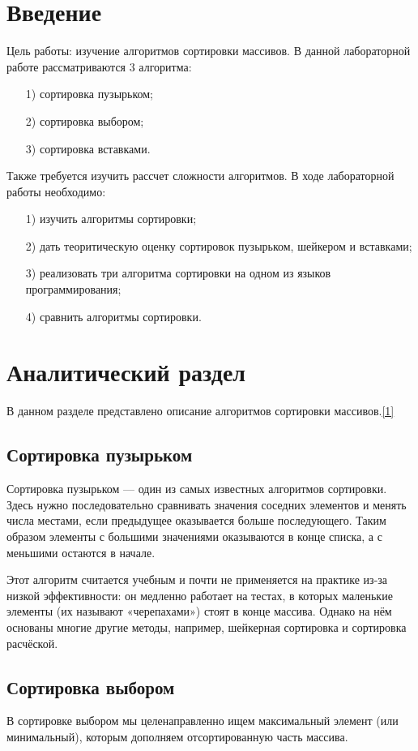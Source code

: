 \documentclass[14pt, a4paper]{extarticle}
\begin{document}
\section*{Введение}
Цель работы: изучение алгоритмов сортировки массивов. В данной лабораторной работе рассматриваются 3 алгоритма:
\begin{enumerate}
	\item[1)] сортировка пузырьком;
	\item[2)] сортировка выбором;
	\item[3)] сортировка вставками. 
\end{enumerate}\par
Также требуется изучить рассчет сложности алгоритмов. В ходе лабораторной работы необходимо:
\begin{enumerate}
	\item[1)] изучить алгоритмы сортировки;
	\item[2)] дать теоритическую оценку сортировок пузырьком, шейкером и вставками;
	\item[3)] реализовать три алгоритма сортировки на одном из языков программирования;
	\item[4)] сравнить алгоритмы сортировки.    
\end{enumerate}

\clearpage
\section{Аналитический раздел}
В данном разделе представлено описание алгоритмов сортировки массивов.\hyperref[literature]{[1]}
\subsection{Сортировка пузырьком}
Сортировка пузырьком — один из самых известных алгоритмов сортировки. Здесь нужно последовательно сравнивать значения соседних элементов и менять числа местами, если предыдущее оказывается больше последующего. Таким образом элементы с большими значениями оказываются в конце списка, а с меньшими остаются в начале.\par
Этот алгоритм считается учебным и почти не применяется на практике из-за низкой эффективности: он медленно работает на тестах, в которых маленькие элементы (их называют «черепахами») стоят в конце массива. Однако на нём основаны многие другие методы, например, шейкерная сортировка и сортировка расчёской.
\subsection{Сортировка выбором}
В сортировке выбором мы целенаправленно ищем максимальный элемент (или минимальный), которым дополняем отсортированную часть массива.
\end{document}
